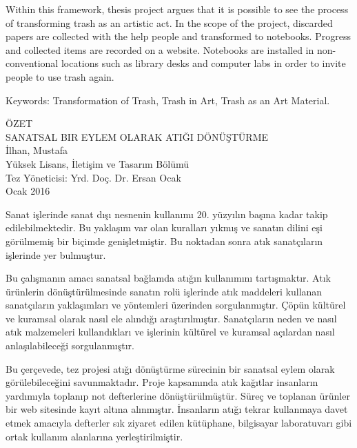 \documentclass[12pt]{report}
\begin{document}
Within this framework, thesis project argues that it is possible to see the process of transforming trash as an artistic act. In the scope of the project, discarded papers are collected with the help people and transformed to notebooks. Progress and collected items are recorded on a website. Notebooks are installed in non-conventional locations such as library desks and computer labs in order to invite people to use trash again. 

\noindent Keywords: Transformation of Trash, Trash in Art, Trash as an Art Material.
\clearpage


\thispagestyle{plain}
{}
\doublespacing
\begin{center}
	\vspace*{9mm}
	\MakeUppercase{Özet}\\
    \vspace{\baselineskip}
    \MakeUppercase{Sanatsal Bir Eylem Olarak Atığı Dönüştürme}\\
    İlhan, Mustafa\\
    Yüksek Lisans, İletişim ve Tasarım Bölümü\\
    Tez Yöneticisi: Yrd. Doç. Dr. Ersan Ocak\\
    \vspace{\baselineskip}
    Ocak 2016
\end{center}
\singlespacing
\par Sanat işlerinde sanat dışı nesnenin kullanımı 20. yüzyılın başına kadar takip edilebilmektedir. Bu yaklaşım var olan kuralları yıkmış ve sanatın dilini eşi görülmemiş bir biçimde genişletmiştir. Bu noktadan sonra atık sanatçıların işlerinde yer bulmuştur.

Bu çalışmanın amacı sanatsal bağlamda atığın kullanımını tartışmaktır. Atık ürünlerin dönüştürülmesinde sanatın rolü işlerinde atık maddeleri kullanan sanatçıların yaklaşımları ve yöntemleri üzerinden sorgulanmıştır. Çöpün kültürel ve kuramsal olarak nasıl ele alındığı araştırılmıştır. Sanatçıların neden ve nasıl atık malzemeleri kullandıkları ve işlerinin kültürel ve kuramsal açılardan nasıl anlaşılabileceği sorgulanmıştır.

Bu çerçevede, tez projesi atığı dönüştürme sürecinin bir sanatsal eylem olarak görülebileceğini savunmaktadır. Proje kapsamında atık kağıtlar insanların yardımıyla toplanıp not defterlerine dönüştürülmüştür. Süreç ve toplanan ürünler bir web sitesinde kayıt altına alınmıştır. İnsanların atığı tekrar kullanmaya davet etmek amacıyla defterler sık ziyaret edilen kütüphane, bilgisayar laboratuvarı gibi ortak kullanım alanlarına yerleştirilmiştir.
\end{document}

